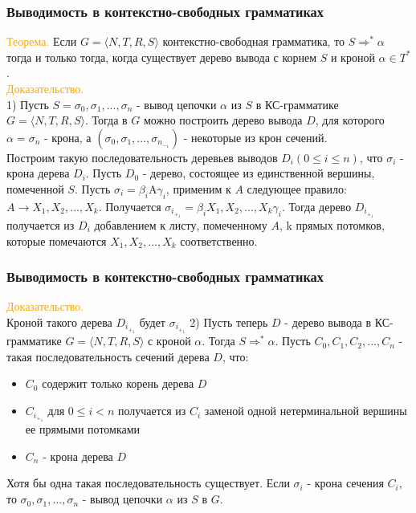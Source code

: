 \documentclass{beamer}
\begin{document}
		\begin{frame}
    \frametitle{Выводимость в контекстно-свободных грамматиках}
        \textcolor{orange}{Теорема.} Если $G=\langle N,T,R,S \rangle$ контекстно-свободная грамматика, то $S \Rightarrow ^\ast \alpha$ тогда и только тогда, когда существует дерево вывода с корнем $S$ и кроной $\alpha \in T^\ast$.\\
        \vspace{3mm}
        \textcolor{orange}{Доказательство.}\\ 1) Пусть $S = \sigma_0, \sigma_1, ... , \sigma_n$ - вывод цепочки  $\alpha$ из $S$ в КС-грамматике $G=\langle N,T,R,S \rangle$. Тогда в $G$ можно построить дерево вывода $D$, для которого $\alpha =\sigma_n$ - крона, а $(\sigma_0, \sigma_1, ... , \sigma_n_-_1)$ - некоторые из крон сечений.\\
        Построим такую последовательность деревьев выводов $D_i (0 \leq i \leq n)$, что $\sigma_i$ - крона дерева $D_i$. Пусть $D_0$ - дерево, состоящее из единственной вершины, помеченной $S$. Пусть $\sigma_i = \beta_i$A$\gamma_i$, применим к $A$ следующее правило: $A \rightarrow X_1, X_2, ..., X_k$. Получается $\sigma_i_+_1 = \beta_iX_1, X_2, ..., X_k\gamma_i$. Тогда дерево $D_i_+_1$ получается из $D_i$ добавлением к листу, помеченному $A$, k прямых потомков, которые помечаются $X_1, X_2, ..., X_k$ соответственно.
        
	\end{frame}
	
	\begin{frame}
    \frametitle{Выводимость в контекстно-свободных грамматиках}
        \textcolor{orange}{Доказательство.}\\ Кроной такого дерева $D_i_+_1$ будет $\sigma_i_+_1$
        2) Пусть теперь $D$ - дерево вывода в КС-грамматике $G=\langle N,T,R,S \rangle$ с кроной $\alpha$. Тогда $S \Rightarrow ^\ast \alpha$.
        Пусть $C_0, C_1, C_2, ..., C_n$ - такая последовательность сечений дерева $D$, что:\\
        \begin{itemize}
        
        \item $C_0$ содержит только корень дерева $D$\\
        \item $C_i_+_1$ для $0 \leq i < n$ получается из $C_i$ заменой одной нетерминальной вершины ее прямыми потомками\\
        \item $C_n$ - крона дерева $D$\\
        \end{itemize}
        Хотя бы одна такая последовательность существует. Если $\sigma_i$ - крона сечения $C_i$, то $\sigma_0, \sigma_1, ..., \sigma_n$ - вывод цепочки $\alpha$ из $S$ в $G$.
        
	\end{frame}
	
\end{document}
